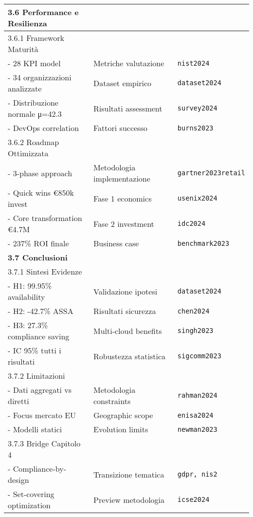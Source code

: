 \documentclass{article}
\begin{document}
\begin{longtable}{p{}|p{}|p{}}
\textbf{3.6 Performance e Resilienza} & & \\
\midrule
3.6.1 Framework Maturità & & \\
- 28 KPI model & Metriche valutazione & \texttt{nist2024} \\
- 34 organizzazioni analizzate & Dataset empirico & \texttt{dataset2024} \\
- Distribuzione normale μ=42.3 & Risultati assessment & \texttt{survey2024} \\
- DevOps correlation & Fattori successo & \texttt{burns2023} \\
\midrule
3.6.2 Roadmap Ottimizzata & & \\
- 3-phase approach & Metodologia implementazione & \texttt{gartner2023retail} \\
- Quick wins €850k invest & Fase 1 economics & \texttt{usenix2024} \\
- Core transformation €4.7M & Fase 2 investment & \texttt{idc2024} \\
- 237\% ROI finale & Business case & \texttt{benchmark2023} \\
\midrule

\textbf{3.7 Conclusioni} & & \\
\midrule
3.7.1 Sintesi Evidenze & & \\
- H1: 99.95\% availability & Validazione ipotesi & \texttt{dataset2024} \\
- H2: -42.7\% ASSA & Risultati sicurezza & \texttt{chen2024} \\
- H3: 27.3\% compliance saving & Multi-cloud benefits & \texttt{singh2023} \\
- IC 95\% tutti i risultati & Robustezza statistica & \texttt{sigcomm2023} \\
\midrule
3.7.2 Limitazioni & & \\
- Dati aggregati vs diretti & Metodologia constraints & \texttt{rahman2024} \\
- Focus mercato EU & Geographic scope & \texttt{enisa2024} \\
- Modelli statici & Evolution limits & \texttt{newman2023} \\
\midrule
3.7.3 Bridge Capitolo 4 & & \\
- Compliance-by-design & Transizione tematica & \texttt{gdpr, nis2} \\
- Set-covering optimization & Preview metodologia & \texttt{icse2024} \\
\midrule
\end{longtable}
\end{document}
